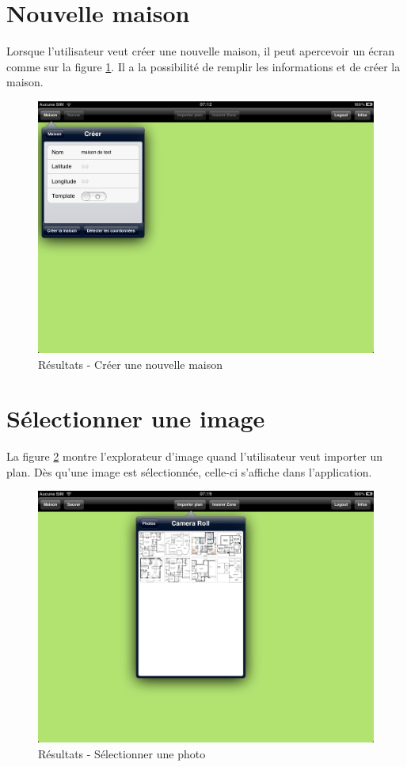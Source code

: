 \section{Nouvelle maison} %
\label{sub:nouvelle_maison}
Lorsque l'utilisateur veut créer une nouvelle maison, il peut apercevoir un écran comme sur la figure \ref{gra:res06}. Il a la possibilité de remplir les informations et de créer la maison.
\begin{figure}[H]
        \centering
        \includegraphics[width=\textwidth]{00_media/07_06.PNG}
        \caption{Résultats - Créer une nouvelle maison}
        \label{gra:res06}
\end{figure}

\clearpage


\section{Sélectionner une image} %
\label{sub:s_lectionner_une_image}
La figure \ref{gra:res07} montre l'explorateur d'image quand l'utilisateur veut importer un plan. Dès qu'une image est sélectionnée, celle-ci s'affiche dans l'application.
\begin{figure}[H]
        \centering
        \includegraphics[width=\textwidth]{00_media/07_07.PNG}
        \caption{Résultats - Sélectionner une photo}
        \label{gra:res07}
\end{figure}

